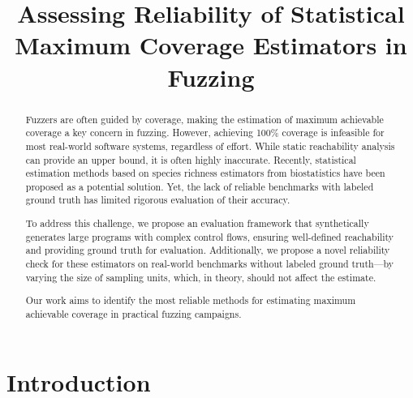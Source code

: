 \documentclass[conference,anonymous,review]{IEEEtran}
\newcommand{\mytitle}{Assessing Reliability of Statistical Maximum Coverage Estimators in Fuzzing}
\begin{document}
\title{\mytitle}


\maketitle

\thispagestyle{plain}
\pagestyle{plain} 


\begin{abstract}
Fuzzers are often guided by coverage, making the estimation of maximum 
achievable coverage a key concern in fuzzing.
However, achieving 100\% coverage is infeasible for most real-world
software systems, regardless of effort.
While static reachability analysis can provide an upper bound,
it is often highly inaccurate.
Recently, statistical estimation methods based on species richness
estimators from biostatistics have been proposed as a potential solution.
Yet, the lack of reliable benchmarks with labeled ground truth has
limited rigorous evaluation of their accuracy.

To address this challenge, we propose an evaluation framework that
synthetically generates large programs with complex control flows,
ensuring well-defined reachability and providing ground truth for evaluation.
Additionally, we propose a novel reliability check for these estimators
on real-world benchmarks without labeled ground truth—by varying the size
of sampling units, which, in theory, should not affect the estimate.

Our work aims to identify the most reliable methods for estimating
maximum achievable coverage in practical fuzzing campaigns.
\end{abstract}


\section{Introduction}
\end{document}
